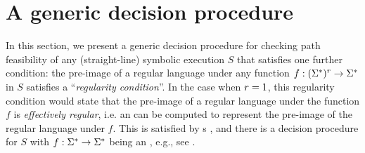 

\section{A generic decision procedure} \label{sec:algo}
%

\vspace{-2mm}

In this section, we present a generic decision procedure for checking path feasibility of any
(straight-line) symbolic execution $S$
that satisfies one further condition:
the pre-image of a regular language under any function 
$f: (\Sigma^*)^r \to \Sigma^*$ in $S$ satisfies a 
``\emph{regularity condition}''.
In the case when $r=1$, this regularity condition would state that the pre-image
of a regular language under the function $f$ is \emph{effectively regular}, i.e. an \FA{} can be computed to represent the pre-image of the regular language under $f$. This is
satisfied by \FT{}s \cite{Berstel,BG07,BG08}, and there is
a decision procedure for %
$S$ %
with $f: \Sigma^* \to \Sigma^*$ being an \FT{}, e.g., see 
\cite{LB16,BG07,BG08}. %


